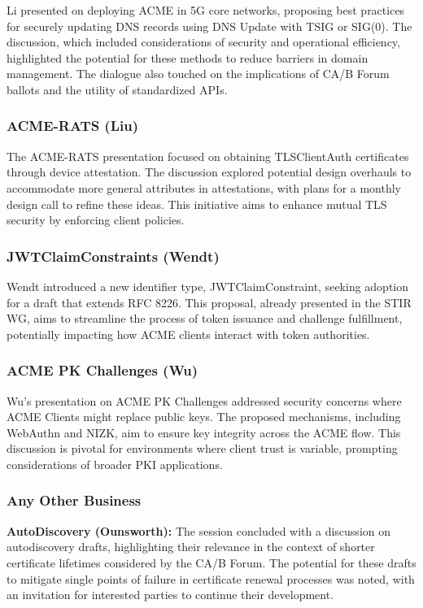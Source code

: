 \documentclass{article}
\begin{document}
Li presented on deploying ACME in 5G core networks, proposing best practices for securely updating DNS records using DNS Update with TSIG or SIG(0). The discussion, which included considerations of security and operational efficiency, highlighted the potential for these methods to reduce barriers in domain management. The dialogue also touched on the implications of CA/B Forum ballots and the utility of standardized APIs.

\subsubsection{ACME-RATS (Liu)}

The ACME-RATS presentation focused on obtaining TLSClientAuth certificates through device attestation. The discussion explored potential design overhauls to accommodate more general attributes in attestations, with plans for a monthly design call to refine these ideas. This initiative aims to enhance mutual TLS security by enforcing client policies.

\subsubsection{JWTClaimConstraints (Wendt)}

Wendt introduced a new identifier type, JWTClaimConstraint, seeking adoption for a draft that extends RFC 8226. This proposal, already presented in the STIR WG, aims to streamline the process of token issuance and challenge fulfillment, potentially impacting how ACME clients interact with token authorities.

\subsubsection{ACME PK Challenges (Wu)}

Wu's presentation on ACME PK Challenges addressed security concerns where ACME Clients might replace public keys. The proposed mechanisms, including WebAuthn and NIZK, aim to ensure key integrity across the ACME flow. This discussion is pivotal for environments where client trust is variable, prompting considerations of broader PKI applications.

\subsubsection{Any Other Business}

\textbf{AutoDiscovery (Ounsworth):} The session concluded with a discussion on autodiscovery drafts, highlighting their relevance in the context of shorter certificate lifetimes considered by the CA/B Forum. The potential for these drafts to mitigate single points of failure in certificate renewal processes was noted, with an invitation for interested parties to continue their development.
\end{document}
